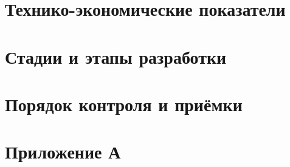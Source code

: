 \documentclass{bmstu-gost-7-32}
\begin{document}

\section{Технико-экономические показатели}


\section{Стадии и этапы разработки}


\section{Порядок контроля и приёмки}


\section{Приложение А}

\end{document}
